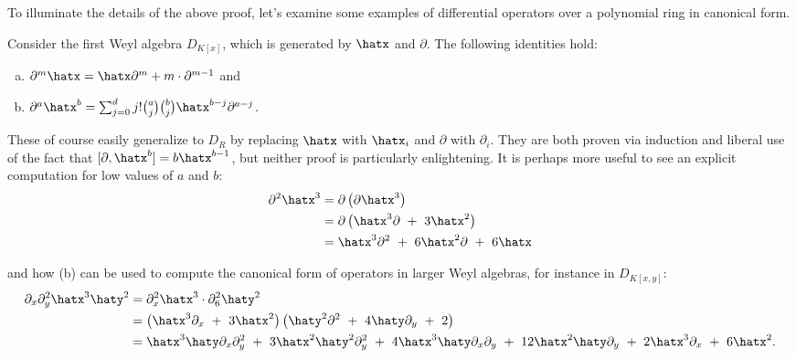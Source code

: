 To illuminate the details of the above proof, let's examine some examples of differential operators over a polynomial ring in canonical form.
\begin{example}\label{example:diff-op-canonical-form}
	Consider the first Weyl algebra $D_{K[x]}$, which is generated by $\hatx$ and $\partial$. The following identities hold:
	\begin{enumerate}[(a)]
		\item $\partial^m \hatx = \hatx\partial^m + m\cdot\partial^{m-1}$ and 
		\item $\partial^a\hatx^b = \sum^d_{j=0} j!\binom{a}{j}\binom{b}{j} \hatx^{b-j}\partial^{a-j}$.
	\end{enumerate}
	These of course easily generalize to $D_{R}$ by replacing $\hatx$ with $\hatx_i$ and $\partial$ with $\partial_i$. They are both proven via induction and liberal use of the fact that $[\partial,\hatx^b] = b\hatx^{b-1}$, but neither proof is particularly enlightening. It is perhaps more useful to see an explicit computation for low values of $a$ and $b$:
    \begin{align*}
    	\partial^2\hatx^3 
		&= \partial\left(\partial \hatx^3\right) \\
		&= \partial\left(\hatx^3\partial ~+~ 3\hatx^2\right) \\
		&= \hatx^3\partial^2 ~+~ 6\hatx^2\partial ~+~ 6\hatx
    \end{align*}

	\begin{comment}
		It is perhaps more useful to see how $\hatx$ migrates across the $\partial$ terms in (a),
		\begin{align*}
			\partial^m\hatx
			&= \partial^{m-1}(\hatx\partial+1) ~=~ \partial^{m-1}\hatx\partial+\partial^{m-1}\\
			&= \partial^{m-2}(\hatx\partial+1)\partial + \partial^{m-1}~=~  \partial^{m-2}\hatx\partial^2+2\partial^{m-1} \\
			&\hspace{0.5em}\vdots \\
			&= \partial \hatx\partial^{m-1}+ (m-1)\partial^{m-1} ~=~ (\hatx\partial + 1)\partial^{m-1} + (m-1)\partial^{m-1}\\
			&= \hatx\partial^m + m\partial^{m-1},
		\end{align*}
	\end{comment}

	\noindent and how (b) can be used to compute the canonical form of operators in larger Weyl algebras, for instance in $D_{K[x,y]}$:
	\begin{align*}
		\partial_x\partial^2_y\hatx^3\haty^2
		&= \partial^2_x\hatx^3\cdot  \partial_6^2\haty^2 \\
		&= \left(\hatx^3\partial_x ~+~ 3\hatx^2\right)\left(\haty^2\partial^2 ~+~ 4\haty\partial_y ~+~ 2\right) \\
		&= \hatx^3\haty\partial_x\partial_y^2 ~+~ 3\hatx^2\haty^2\partial^2_y ~+~ 4\hatx^3\haty\partial_x\partial_y ~+~ 12\hatx^2\haty\partial_y ~+~ 2\hatx^3\partial_x ~+~ 6\hatx^2.
	\end{align*}
\end{example}
